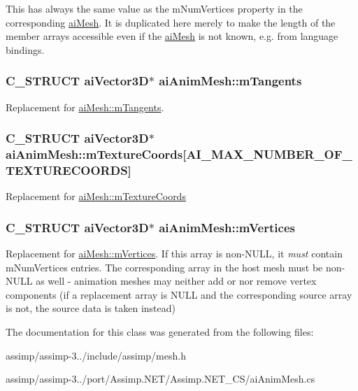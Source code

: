 This has always the same value as the m\+Num\+Vertices property in the corresponding \hyperlink{structai_mesh}{ai\+Mesh}. It is duplicated here merely to make the length of the member arrays accessible even if the \hyperlink{structai_mesh}{ai\+Mesh} is not known, e.\+g. from language bindings. \hypertarget{structai_anim_mesh_a95dcc49c6d5ecc570ceb54552a0a9625}{
\subsubsection[{m\+Tangents}]{\setlength{\rightskip}{0pt plus 5cm}C\+\_\+\+S\+T\+R\+U\+C\+T {\bf ai\+Vector3\+D}$\ast$ ai\+Anim\+Mesh\+::m\+Tangents}}\label{structai_anim_mesh_a95dcc49c6d5ecc570ceb54552a0a9625}
Replacement for \hyperlink{structai_mesh_af367ff78bd69f3e83d7edc8ad67dc5df}{ai\+Mesh\+::m\+Tangents}. \hypertarget{structai_anim_mesh_ad24a0451adeb845a53eb2351b9462e0a}{
\subsubsection[{m\+Texture\+Coords}]{\setlength{\rightskip}{0pt plus 5cm}C\+\_\+\+S\+T\+R\+U\+C\+T {\bf ai\+Vector3\+D}$\ast$ ai\+Anim\+Mesh\+::m\+Texture\+Coords\mbox{[}A\+I\+\_\+\+M\+A\+X\+\_\+\+N\+U\+M\+B\+E\+R\+\_\+\+O\+F\+\_\+\+T\+E\+X\+T\+U\+R\+E\+C\+O\+O\+R\+D\+S\mbox{]}}}\label{structai_anim_mesh_ad24a0451adeb845a53eb2351b9462e0a}
Replacement for \hyperlink{structai_mesh_a4a50b11d00ef50f419c75cab0f6bddd6}{ai\+Mesh\+::m\+Texture\+Coords} \hypertarget{structai_anim_mesh_a0ac2dd4c1afd23e6a9293b1d0ded3060}{
\subsubsection[{m\+Vertices}]{\setlength{\rightskip}{0pt plus 5cm}C\+\_\+\+S\+T\+R\+U\+C\+T {\bf ai\+Vector3\+D}$\ast$ ai\+Anim\+Mesh\+::m\+Vertices}}\label{structai_anim_mesh_a0ac2dd4c1afd23e6a9293b1d0ded3060}
Replacement for \hyperlink{structai_mesh_afd4588abb3e1c72821ae0234a3850662}{ai\+Mesh\+::m\+Vertices}. If this array is non-\/\+N\+U\+L\+L, it {\itshape must} contain m\+Num\+Vertices entries. The corresponding array in the host mesh must be non-\/\+N\+U\+L\+L as well -\/ animation meshes may neither add or nor remove vertex components (if a replacement array is N\+U\+L\+L and the corresponding source array is not, the source data is taken instead) 

The documentation for this class was generated from the following files\+:\begin{DoxyCompactItemize}
\item 
assimp/assimp-\/3../include/assimp/mesh.\+h\item 
assimp/assimp-\/3../port/\+Assimp.\+N\+E\+T/\+Assimp.\+N\+E\+T\+\_\+\+C\+S/ai\+Anim\+Mesh.\+cs\end{DoxyCompactItemize}
